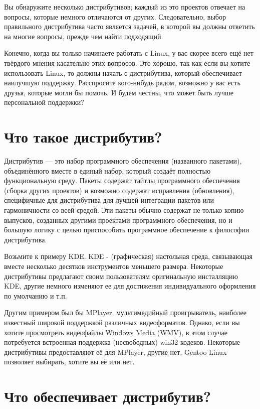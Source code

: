 \documentclass[10pt]{book}
\begin{document}
Вы обнаружите несколько дистрибутивов; каждый из это проектов отвечает на вопросы, которые немного отличаются от других. Следовательно, выбор правильного дистрибутива часто является задачей, в которой вы должны ответить на многие вопросы, прежде чем найти подходящий.

Конечно, когда вы только начинаете работать с Linux, у вас скорее всего ещё нет твёрдого мнения касательно этих вопросов. Это хорошо, так как если вы хотите  использовать Linux, то должны начать с дистрибутива, который обеспечивает наилучшую поддержку. Расспросите кого-нибудь рядом, возможно у вас есть друзья, которые могли бы помочь. И будем честны, что может быть лучше персональной поддержки?

\section{Что такое дистрибутив?}

Дистрибутив --- это набор программного обеспечения (названного пакетами), объединённого вместе в единый набор, который создаёт полностью функциональную среду. Пакеты содержат тайтлы программного обеспечения (сборка других проектов) и возможно содержат исправления (обновления), специфичные для дистрибутива для лучшей интеграции пакетов или гармоничности со всей средой. Эти пакеты обычно содержат не только копию выпусков, созданных другими проектами программного обеспечения, но и большую логику с целью приспособить программное обеспечение к  философии дистрибутива.

Возьмите к примеру KDE. KDE - (графическая) настольная среда, связывающая вместе несколько десятков инструментов меньшего размера. Некоторые дистрибутивы предлагают своим пользователям оригинальную инсталляцию KDE, другие немного изменяют ее для достижения индивидуального оформления по умолчанию и т.п.

Другим примером был бы MPlayer, мультимедийный проигрыватель, наиболее известный широкой поддержкой различных видеоформатов. Однако, если вы хотите просмотреть видеофайлы Windows Media (WMV), в этом случае потребуется встроенная поддержка (несвободных) win32 кодеков. Некоторые дистрибутивы предоставляют её для MPlayer, другие нет. Gentoo Linux позволяет выбирать, хотите вы её или нет.

\section{Что обеспечивает дистрибутив?}
\end{document}
